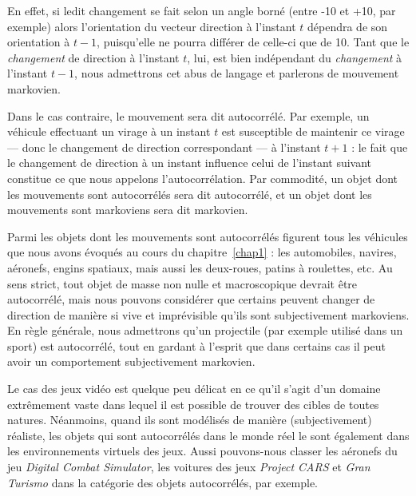 	En effet, si ledit changement se fait selon un angle borné (entre -10\textdegree{} et +10\textdegree{}, par exemple) alors l'orientation du vecteur direction à l'instant $t$ dépendra de son orientation à $t-1$, puisqu'elle ne pourra différer de celle-ci que de 10\textdegree{}. Tant que le \emph{changement} de direction à l'instant $t$, lui, est bien indépendant du \emph{changement} à l'instant $t-1$, nous admettrons cet abus de langage et parlerons de mouvement markovien.
	
	Dans le cas contraire, le mouvement sera dit autocorrélé. Par exemple, un véhicule effectuant un virage à un instant $t$ est susceptible de maintenir ce virage --- donc le changement de direction correspondant --- à l'instant $t+1$ : le fait que le changement de direction à un instant influence celui de l'instant suivant constitue ce que nous appelons l'autocorrélation. Par commodité, un objet dont les mouvements sont autocorrélés sera dit autocorrélé, et un objet dont les mouvements sont markoviens sera dit markovien.

	Parmi les objets dont les mouvements sont autocorrélés figurent tous les véhicules que nous avons évoqués au cours du chapitre~\ref{chap1} : les automobiles, navires, aéronefs, engins spatiaux, mais aussi les deux-roues, patins à roulettes, etc. Au sens strict, tout objet de masse non nulle et macroscopique devrait être autocorrélé, mais nous pouvons considérer que certains peuvent changer de direction de manière si vive et imprévisible qu'ils sont subjectivement markoviens. En règle générale, nous admettrons qu'un projectile (par exemple utilisé dans un sport) est autocorrélé, tout en gardant à l'esprit que dans certains cas il peut avoir un comportement subjectivement markovien.
	
	Le cas des jeux vidéo est quelque peu délicat en ce qu'il s'agit d'un domaine extrêmement vaste dans lequel il est possible de trouver des cibles de toutes natures. Néanmoins, quand ils sont modélisés de manière (subjectivement) réaliste, les objets qui sont autocorrélés dans le monde réel le sont également dans les environnements virtuels des jeux. Aussi pouvons-nous classer les aéronefs du jeu \emph{Digital Combat Simulator}\footnotemark{}, les voitures des jeux \emph{Project CARS}\footnotemark{} et \emph{Gran Turismo}\footnotemark{} dans la catégorie des objets autocorrélés, par exemple.
	
	\addtocounter{footnote}{-2}
	\addtocounter{footnote}{1}
	\addtocounter{footnote}{1}
	
